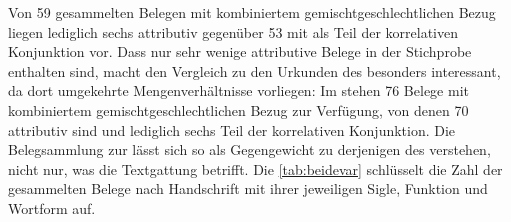 Von 59 gesammelten Belegen mit kombiniertem gemischtgeschlechtlichen Bezug
liegen lediglich sechs attributiv gegenüber 53 mit  als Teil der
korrelativen Konjunktion  
vor. Dass nur sehr wenige attributive Belege in der Stichprobe enthalten sind,
macht den Vergleich zu den Urkunden des \CAO{} besonders interessant,
da dort umgekehrte Mengenverhältnisse vorliegen: Im \CAO{} stehen 76
Belege mit kombiniertem gemischtgeschlechtlichen Bezug zur Verfügung, von denen
70 attributiv sind und lediglich sechs Teil der korrelativen Konjunktion. Die
Belegsammlung zur \KC{} lässt sich so als Gegengewicht zu derjenigen des
\CAO{} verstehen, nicht nur, was die Textgattung betrifft. Die
\cref{tab:beidevar} schlüsselt die Zahl der gesammelten Belege nach Handschrift
mit ihrer jeweiligen Sigle, Funktion und Wortform auf.

